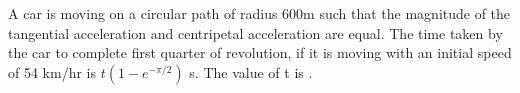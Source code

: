 \item A car is moving on a circular path of radius 600m such that the magnitude of the tangential acceleration and centripetal acceleration are equal. The time taken by the car to complete first quarter of revolution, if it is moving with an initial speed of 54 km/hr is $t \left(1 - e^{-\pi/2}\right)$ s. The value of t is \underline{\hspace{2.5cm}}.

